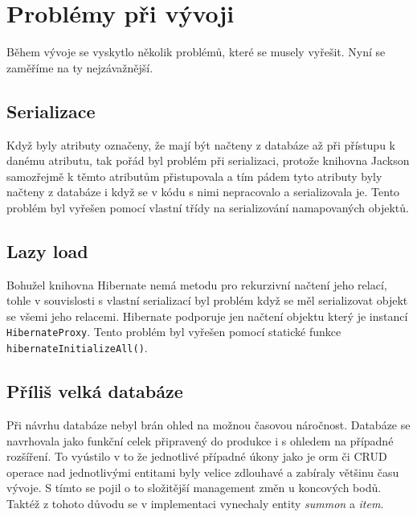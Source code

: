 \section{Problémy při vývoji}
Během vývoje se vyskytlo několik problémů, které se musely vyřešit. Nyní se zaměříme na ty nejzávažnější.
\subsection{Serializace} %
Když byly atributy označeny, že mají být načteny z databáze až při přístupu k danému atributu, tak pořád byl problém při serializaci, protože knihovna Jackson samozřejmě k těmto atributům přistupovala a tím pádem tyto atributy byly načteny z databáze i když se v kódu s nimi nepracovalo a serializovala je. Tento problém byl vyřešen pomocí vlastní třídy 
na serializování namapovaných objektů. 

\subsection{Lazy load}
Bohužel knihovna Hibernate nemá metodu pro rekurzivní načtení jeho relací, tohle v souvislosti s vlastní serializací byl problém když se měl serializovat objekt se všemi jeho relacemi. Hibernate podporuje jen načtení objektu který je instancí \texttt{HibernateProxy}. Tento problém byl vyřešen pomocí statické funkce \texttt{hibernateInitializeAll()}. 

\subsection{Příliš velká databáze}
Při návrhu databáze nebyl brán ohled na možnou časovou náročnost. Databáze se navrhovala jako funkční celek připravený do produkce i s ohledem na případné rozšíření. To vyústilo v to že jednotlivé případné úkony jako je \gls{orm} či CRUD operace nad jednotlivými entitami byly velice zdlouhavé a zabíraly většinu času vývoje. S tímto se pojil o to složitější management změn u koncových bodů. Taktéž z tohoto důvodu se v implementaci vynechaly entity \textit{summon} a \textit{item}.
